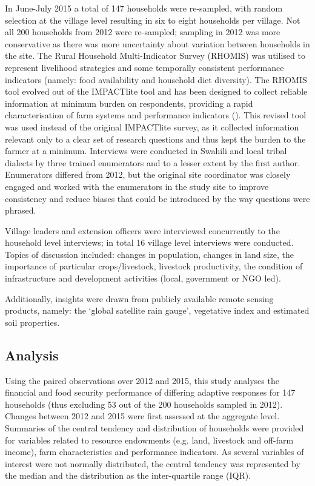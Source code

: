 In June-July 2015 a total of 147 households were re-sampled, with random selection at the village level resulting in six to eight households per village. Not all 200 households from 2012 were re-sampled; sampling in 2012 was more conservative as there was more uncertainty about variation between households in the site. The Rural Household Multi-Indicator Survey (RHOMIS) was utilised to represent livelihood strategies and some temporally consistent performance indicators (namely: food availability and household diet diversity). The RHOMIS tool evolved out of the IMPACTlite tool and has been designed to collect reliable information at minimum burden on respondents, providing a rapid characterisation of farm systems and performance indicators (\citealp{Hammond2017225}). This revised tool was used instead of the original IMPACTlite survey, as it collected information relevant only to a clear set of research questions and thus kept the burden to the farmer at a minimum. Interviews were conducted in Swahili and local tribal dialects by three trained enumerators and to a lesser extent by the first author. Enumerators differed from 2012, but the original site coordinator was closely engaged and worked with the enumerators in the study site to improve consistency and reduce biases that could be introduced by the way questions were phrased.

Village leaders and extension officers were interviewed concurrently to the household level interviews; in total 16 village level interviews were conducted. Topics of discussion included: changes in population, changes in land size, the importance of particular crops/livestock, livestock productivity, the condition of infrastructure and development activities (local, government or NGO led).

Additionally, insights were drawn from publicly available remote sensing products, namely: the `global satellite rain gauge', vegetative index and estimated soil properties.

\subsection{Analysis}

Using the paired observations over 2012 and 2015, this study analyses the financial and food security performance of differing adaptive responses for 147 households (thus excluding 53 out of the 200 households sampled in 2012). Changes between 2012 and 2015 were first assessed at the aggregate level. Summaries of the central tendency and distribution of households were provided for variables related to resource endowments (e.g. land, livestock and off-farm income), farm characteristics and performance indicators. As several variables of interest were not normally distributed, the central tendency was represented by the median and the distribution as the inter-quartile range (IQR).

